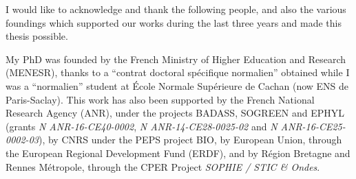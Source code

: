 
\begin{acknowledgements}

\vspace*{-20pt}

I would like to acknowledge and thank the following people, and also the various foundings which supported our works during the last three years and made this thesis possible.

My PhD was founded by the French Ministry of Higher Education and Research (MENESR),
thanks to a ``contrat doctoral spécifique normalien'' obtained while I was a ``normalien'' student at \'Ecole Normale Sup\'erieure de Cachan (now ENS de Paris-Saclay).
This work has also been supported by
the French National Research Agency (ANR), under the projects BADASS, SOGREEN and EPHYL (grants \emph{N ANR-16-CE40-0002}, \emph{N ANR-14-CE28-0025-02} and \emph{N ANR-16-CE25-0002-03}),
by CNRS under the PEPS project BIO,
by European Union, through the European Regional Development Fund (ERDF),
and by R\'egion Bretagne and Rennes Métropole, through the CPER Project \emph{SOPHIE / STIC \& Ondes}.


\end{acknowledgements}
